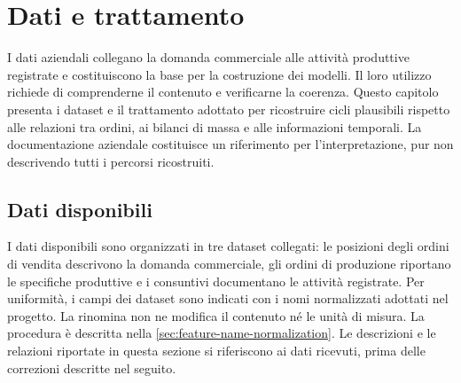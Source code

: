 \chapter{Dati e trattamento}
\label{sec:data-and-treatment}

I dati aziendali collegano la domanda commerciale alle attività produttive registrate e costituiscono la base per la costruzione dei modelli. Il loro utilizzo richiede di comprenderne il contenuto e verificarne la coerenza. Questo capitolo presenta i dataset e il trattamento adottato per ricostruire cicli plausibili rispetto alle relazioni tra ordini, ai bilanci di massa e alle informazioni temporali. La documentazione aziendale costituisce un riferimento per l'interpretazione, pur non descrivendo tutti i percorsi ricostruiti.

\section{Dati disponibili}
\label{sec:updated-datasets}
\label{sec:dataset-links}

I dati disponibili sono organizzati in tre dataset collegati: le posizioni degli ordini di vendita descrivono la domanda commerciale, gli ordini di produzione riportano le specifiche produttive e i consuntivi documentano le attività registrate. Per uniformità, i campi dei dataset sono indicati con i nomi normalizzati adottati nel progetto. La rinomina non ne modifica il contenuto né le unità di misura. La procedura è descritta nella \cref{sec:feature-name-normalization}. Le descrizioni e le relazioni riportate in questa sezione si riferiscono ai dati ricevuti, prima delle correzioni descritte nel seguito.

